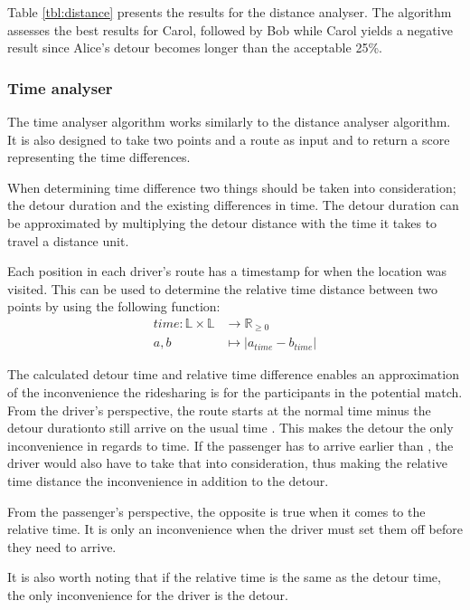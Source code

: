 Table \ref{tbl:distance} presents the results for the distance analyser.
The algorithm assesses the best results for Carol, followed by Bob while Carol yields a negative result since Alice's detour becomes longer than the acceptable 25\%. 


\subsubsection{Time analyser}
The time analyser algorithm works similarly to the distance analyser algorithm. 
It is also designed to take two points and a route as input and to return a score representing the time differences.

When determining time difference two things should be taken into consideration; the detour duration and the existing differences in time.
The detour duration can be approximated by multiplying the detour distance with the time it takes to travel a distance unit.

Each position in each driver's route has a timestamp for when the location was visited.
This can be used to determine the relative time distance between two points by using the following function:
\begin{align*}
	time : \mathbb{L}\times\mathbb{L} &\rightarrow \mathbb{R}_{\geq 0}\\
	a, b &\mapsto | a_{time} - b_{time} |
\end{align*}

The calculated detour time and relative time difference enables an approximation of the inconvenience the ridesharing is for the participants in the potential match.
From the driver's perspective, the route starts at the normal time minus the detour duration\DIFaddbegin {}\DIFaddend to still arrive on the usual time \DIFaddbegin {}\DIFaddend .
This makes the detour the only inconvenience in regards to time.
If the passenger has to arrive earlier than \DIFdelbegin {}\DIFdelend \DIFaddbegin {}\DIFaddend , the driver would also have to take that into consideration, thus making the relative time distance the inconvenience in addition to the detour.

From the passenger's perspective, the opposite is true when it comes to the relative time. 
It is only an inconvenience when the driver must set them off before they need to arrive.

It is also worth noting that if the relative time is the same as the detour time, the only inconvenience for the driver is the detour.

